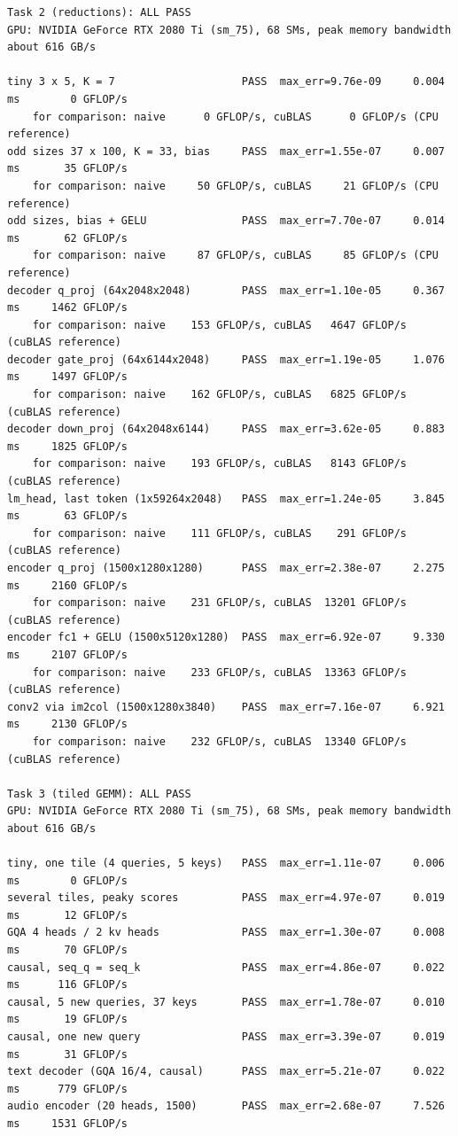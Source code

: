 \documentclass{article}
\begin{document}
{\begin{verbatim}
Task 2 (reductions): ALL PASS
GPU: NVIDIA GeForce RTX 2080 Ti (sm_75), 68 SMs, peak memory bandwidth about 616 GB/s

tiny 3 x 5, K = 7                    PASS  max_err=9.76e-09     0.004 ms        0 GFLOP/s
    for comparison: naive      0 GFLOP/s, cuBLAS      0 GFLOP/s (CPU reference)
odd sizes 37 x 100, K = 33, bias     PASS  max_err=1.55e-07     0.007 ms       35 GFLOP/s
    for comparison: naive     50 GFLOP/s, cuBLAS     21 GFLOP/s (CPU reference)
odd sizes, bias + GELU               PASS  max_err=7.70e-07     0.014 ms       62 GFLOP/s
    for comparison: naive     87 GFLOP/s, cuBLAS     85 GFLOP/s (CPU reference)
decoder q_proj (64x2048x2048)        PASS  max_err=1.10e-05     0.367 ms     1462 GFLOP/s
    for comparison: naive    153 GFLOP/s, cuBLAS   4647 GFLOP/s (cuBLAS reference)
decoder gate_proj (64x6144x2048)     PASS  max_err=1.19e-05     1.076 ms     1497 GFLOP/s
    for comparison: naive    162 GFLOP/s, cuBLAS   6825 GFLOP/s (cuBLAS reference)
decoder down_proj (64x2048x6144)     PASS  max_err=3.62e-05     0.883 ms     1825 GFLOP/s
    for comparison: naive    193 GFLOP/s, cuBLAS   8143 GFLOP/s (cuBLAS reference)
lm_head, last token (1x59264x2048)   PASS  max_err=1.24e-05     3.845 ms       63 GFLOP/s
    for comparison: naive    111 GFLOP/s, cuBLAS    291 GFLOP/s (cuBLAS reference)
encoder q_proj (1500x1280x1280)      PASS  max_err=2.38e-07     2.275 ms     2160 GFLOP/s
    for comparison: naive    231 GFLOP/s, cuBLAS  13201 GFLOP/s (cuBLAS reference)
encoder fc1 + GELU (1500x5120x1280)  PASS  max_err=6.92e-07     9.330 ms     2107 GFLOP/s
    for comparison: naive    233 GFLOP/s, cuBLAS  13363 GFLOP/s (cuBLAS reference)
conv2 via im2col (1500x1280x3840)    PASS  max_err=7.16e-07     6.921 ms     2130 GFLOP/s
    for comparison: naive    232 GFLOP/s, cuBLAS  13340 GFLOP/s (cuBLAS reference)

Task 3 (tiled GEMM): ALL PASS
GPU: NVIDIA GeForce RTX 2080 Ti (sm_75), 68 SMs, peak memory bandwidth about 616 GB/s

tiny, one tile (4 queries, 5 keys)   PASS  max_err=1.11e-07     0.006 ms        0 GFLOP/s
several tiles, peaky scores          PASS  max_err=4.97e-07     0.019 ms       12 GFLOP/s
GQA 4 heads / 2 kv heads             PASS  max_err=1.30e-07     0.008 ms       70 GFLOP/s
causal, seq_q = seq_k                PASS  max_err=4.86e-07     0.022 ms      116 GFLOP/s
causal, 5 new queries, 37 keys       PASS  max_err=1.78e-07     0.010 ms       19 GFLOP/s
causal, one new query                PASS  max_err=3.39e-07     0.019 ms       31 GFLOP/s
text decoder (GQA 16/4, causal)      PASS  max_err=5.21e-07     0.022 ms      779 GFLOP/s
audio encoder (20 heads, 1500)       PASS  max_err=2.68e-07     7.526 ms     1531 GFLOP/s


\end{verbatim}}
\end{document}
